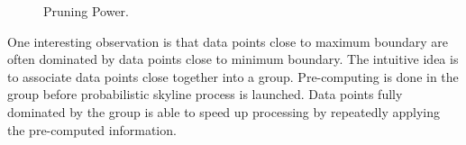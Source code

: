 \begin{figure}[t]
\vspace*{-20pt}
  \centering
    \hspace*{-14pt}
  \label{figure:rect}
    \caption{Pruning Power.}
\vspace*{-16pt}
\end{figure}


One interesting observation is that data points close to maximum boundary are often dominated by data points close to minimum boundary. The intuitive idea is to associate data points close together into a group. Pre-computing is done in the group before probabilistic skyline process is launched. Data points fully dominated by the group is able to speed up processing by repeatedly applying the pre-computed information.


